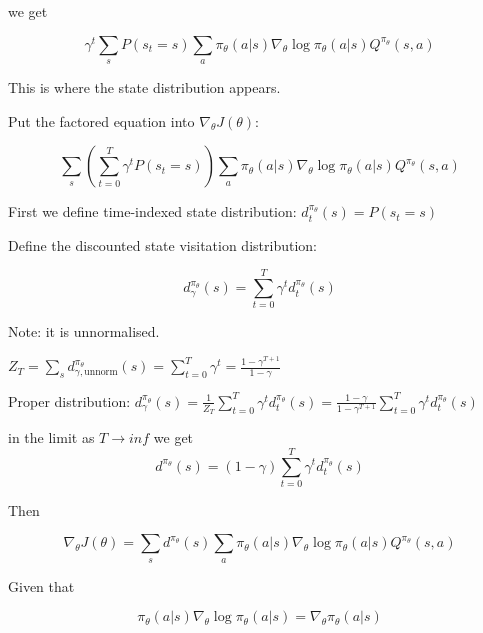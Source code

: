 \documentclass[preprint,12pt]{elsarticle}
\begin{document}
we get

\begin{equation}
\label{eq:state-distribution-one-step}
\gamma^t \sum_s P(s_t=s) \sum_a \pi_\theta(a|s) \nabla_\theta \log \pi_\theta(a|s) Q^{\pi_\theta}(s,a)
\end{equation}

This is where the state distribution appears.

Put the factored equation into $\nabla_\theta J(\theta)$:

\begin{equation}
\label{eq:policy-gradient-state-sum-expanded}
\sum_s \left( \sum_{t=0}^T \gamma^t P(s_t=s) \right) \sum_a \pi_\theta(a|s) \nabla_\theta \log \pi_\theta(a|s) Q^{\pi_\theta}(s,a)
\end{equation}

First we define time-indexed state distribution:
$d_t^{\pi_\theta}(s) = P(s_t = s)$

Define the discounted state visitation distribution:


\begin{equation}
\label{eq:discounted-state-visitation-unnormalized}
d_\gamma^{\pi_\theta}(s) = \sum_{t=0}^T \gamma^t d_t^{\pi_\theta}(s)
\end{equation}

Note: it is unnormalised.

$  Z_T = \sum_s d_{\gamma,\mathrm{unnorm}}^{\pi_\theta}(s)
= \sum_{t=0}^{T} \gamma^t
= \frac{1-\gamma^{T+1}}{1-\gamma}
$

Proper distribution:
$ d_\gamma^{\pi_\theta}(s)
= \frac{1}{Z_T} \sum_{t=0}^{T} \gamma^t d_t^{\pi_\theta}(s)
= \frac{1-\gamma}{1-\gamma^{T+1}}
\sum_{t=0}^{T} \gamma^t d_t^{\pi_\theta}(s)
$

in the limit as $T \rightarrow inf$ we get 
\begin{equation}
\label{eq:discounted-state-visitation}
d^{\pi_\theta}(s) = (1-\gamma) \sum_{t=0}^{T} \gamma^t d^{\pi_\theta}_t(s)
\end{equation}

Then

\begin{equation}
\label{eq:policy-gradient-state-sum-log}
\nabla_\theta J(\theta) = \sum_s d^{\pi_\theta}(s) \sum_a \pi_\theta(a|s) \nabla_\theta \log \pi_\theta(a|s) Q^{\pi_\theta}(s,a)
\end{equation}

Given that

\begin{equation}
\label{eq:score-to-policy-gradient}
\pi_\theta(a|s) \nabla_\theta \log \pi_\theta(a|s) = \nabla_\theta \pi_\theta(a|s)
\end{equation}
\end{document}
